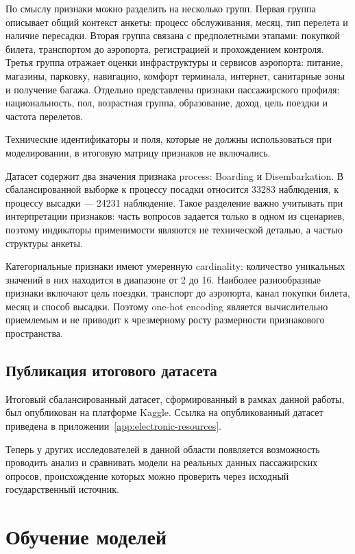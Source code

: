 \documentclass[14pt,a4paper]{extreport}
\begin{document}
По смыслу признаки можно разделить на несколько групп. Первая группа описывает общий контекст анкеты: процесс обслуживания, месяц, тип перелета и наличие пересадки. Вторая группа связана с предполетными этапами: покупкой билета, транспортом до аэропорта, регистрацией и прохождением контроля. Третья группа отражает оценки инфраструктуры и сервисов аэропорта: питание, магазины, парковку, навигацию, комфорт терминала, интернет, санитарные зоны и получение багажа. Отдельно представлены признаки пассажирского профиля: национальность, пол, возрастная группа, образование, доход, цель поездки и частота перелетов.

Технические идентификаторы и поля, которые не должны использоваться при моделировании, в итоговую матрицу признаков не включались.

Датасет содержит два значения признака process: Boarding и Disembarkation. В сбалансированной выборке к процессу посадки относится 33283 наблюдения, к процессу высадки --- 24231 наблюдение. Такое разделение важно учитывать при интерпретации признаков: часть вопросов задается только в одном из сценариев, поэтому индикаторы применимости являются не технической деталью, а частью структуры анкеты.

Категориальные признаки имеют умеренную cardinality: количество уникальных значений в них находится в диапазоне от 2 до 16. Наиболее разнообразные признаки включают цель поездки, транспорт до аэропорта, канал покупки билета, месяц и способ высадки. Поэтому one-hot encoding является вычислительно приемлемым и не приводит к чрезмерному росту размерности признакового пространства.

\section{Публикация итогового датасета}

Итоговый сбалансированный датасет, сформированный в рамках данной работы, был опубликован на платформе Kaggle. Ссылка на опубликованный датасет приведена в приложении~\ref{app:electronic-resources}.

Теперь у других исследователей в данной области появляется возможность проводить анализ и сравнивать модели на реальных данных пассажирских опросов, происхождение которых можно проверить через исходный государственный источник.

\chapter{Обучение моделей}
\end{document}
